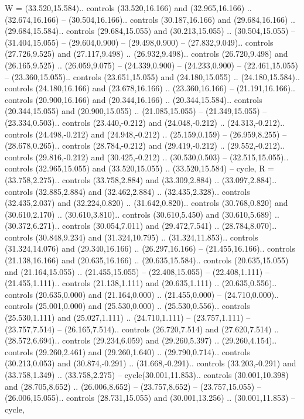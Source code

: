 {W} = {(33.520,15.584).. controls (33.520,16.166) and (32.965,16.166) .. (32.674,16.166) -- (30.504,16.166).. controls (30.187,16.166) and (29.684,16.166) .. (29.684,15.584).. controls (29.684,15.055) and (30.213,15.055) .. (30.504,15.055) -- (31.404,15.055) -- (29.604,0.900) -- (29.498,0.900) -- (27.832,9.049).. controls (27.726,9.525) and (27.117,9.498) .. (26.932,9.498).. controls (26.720,9.498) and (26.165,9.525) .. (26.059,9.075) -- (24.339,0.900) -- (24.233,0.900) -- (22.461,15.055) -- (23.360,15.055).. controls (23.651,15.055) and (24.180,15.055) .. (24.180,15.584).. controls (24.180,16.166) and (23.678,16.166) .. (23.360,16.166) -- (21.191,16.166).. controls (20.900,16.166) and (20.344,16.166) .. (20.344,15.584).. controls (20.344,15.055) and (20.900,15.055) .. (21.085,15.055) -- (21.349,15.055) -- (23.334,0.503).. controls (23.440,-0.212) and (24.048,-0.212) .. (24.313,-0.212).. controls (24.498,-0.212) and (24.948,-0.212) .. (25.159,0.159) -- (26.959,8.255) -- (28.678,0.265).. controls (28.784,-0.212) and (29.419,-0.212) .. (29.552,-0.212).. controls (29.816,-0.212) and (30.425,-0.212) .. (30.530,0.503) -- (32.515,15.055).. controls (32.965,15.055) and (33.520,15.055) .. (33.520,15.584) -- cycle},
{R} = {(33.758,2.275).. controls (33.758,2.884) and (33.309,2.884) .. (33.097,2.884).. controls (32.885,2.884) and (32.462,2.884) .. (32.435,2.328).. controls (32.435,2.037) and (32.224,0.820) .. (31.642,0.820).. controls (30.768,0.820) and (30.610,2.170) .. (30.610,3.810).. controls (30.610,5.450) and (30.610,5.689) .. (30.372,6.271).. controls (30.054,7.011) and (29.472,7.541) .. (28.784,8.070).. controls (30.848,9.234) and (31.324,10.795) .. (31.324,11.853).. controls (31.324,14.076) and (29.340,16.166) .. (26.297,16.166) -- (21.455,16.166).. controls (21.138,16.166) and (20.635,16.166) .. (20.635,15.584).. controls (20.635,15.055) and (21.164,15.055) .. (21.455,15.055) -- (22.408,15.055) -- (22.408,1.111) -- (21.455,1.111).. controls (21.138,1.111) and (20.635,1.111) .. (20.635,0.556).. controls (20.635,0.000) and (21.164,0.000) .. (21.455,0.000) -- (24.710,0.000).. controls (25.001,0.000) and (25.530,0.000) .. (25.530,0.556).. controls (25.530,1.111) and (25.027,1.111) .. (24.710,1.111) -- (23.757,1.111) -- (23.757,7.514) -- (26.165,7.514).. controls (26.720,7.514) and (27.620,7.514) .. (28.572,6.694).. controls (29.234,6.059) and (29.260,5.397) .. (29.260,4.154).. controls (29.260,2.461) and (29.260,1.640) .. (29.790,0.714).. controls (30.213,0.053) and (30.874,-0.291) .. (31.668,-0.291).. controls (33.203,-0.291) and (33.758,1.349) .. (33.758,2.275) -- cycle(30.001,11.853).. controls (30.001,10.398) and (28.705,8.652) .. (26.006,8.652) -- (23.757,8.652) -- (23.757,15.055) -- (26.006,15.055).. controls (28.731,15.055) and (30.001,13.256) .. (30.001,11.853) -- cycle},
